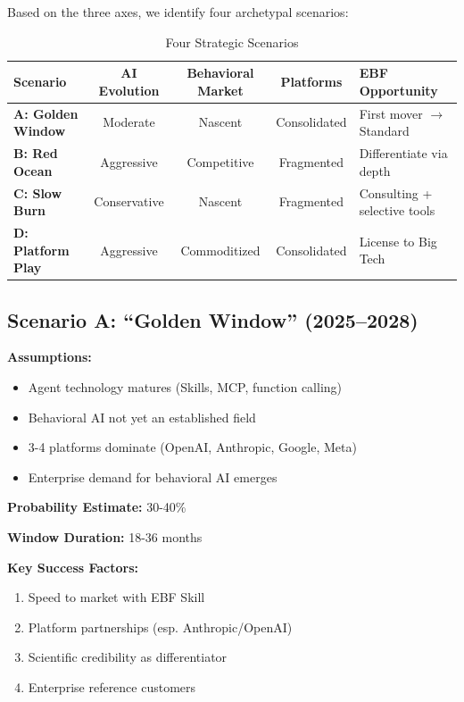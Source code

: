 Based on the three axes, we identify four archetypal scenarios:

\begin{table}[htbp]
\centering
\caption{Four Strategic Scenarios}
\label{tab:vvv-scenarios}
\renewcommand{\arraystretch}{1.4}
\begin{tabular}{@{}lcccp{4cm}@{}}
\toprule
\textbf{Scenario} & \textbf{AI Evolution} & \textbf{Behavioral Market} & \textbf{Platforms} & \textbf{EBF Opportunity} \\
\midrule
\textbf{A: Golden Window} & Moderate & Nascent & Consolidated & First mover $\to$ Standard \\
\textbf{B: Red Ocean} & Aggressive & Competitive & Fragmented & Differentiate via depth \\
\textbf{C: Slow Burn} & Conservative & Nascent & Fragmented & Consulting + selective tools \\
\textbf{D: Platform Play} & Aggressive & Commoditized & Consolidated & License to Big Tech \\
\bottomrule
\end{tabular}
\end{table}


\subsection{Scenario A: ``Golden Window'' (2025--2028)}

\begin{tcolorbox}[colback=green!5!white, colframe=green!75!black,
    title=Scenario A: Golden Window]

\textbf{Assumptions:}
\begin{itemize}[nosep]
\item Agent technology matures (Skills, MCP, function calling)
\item Behavioral AI not yet an established field
\item 3-4 platforms dominate (OpenAI, Anthropic, Google, Meta)
\item Enterprise demand for behavioral AI emerges
\end{itemize}

\textbf{Probability Estimate:} 30-40\%

\textbf{Window Duration:} 18-36 months

\textbf{Key Success Factors:}
\begin{enumerate}[nosep]
\item Speed to market with EBF Skill
\item Platform partnerships (esp. Anthropic/OpenAI)
\item Scientific credibility as differentiator
\item Enterprise reference customers
\end{enumerate}

\end{tcolorbox}


